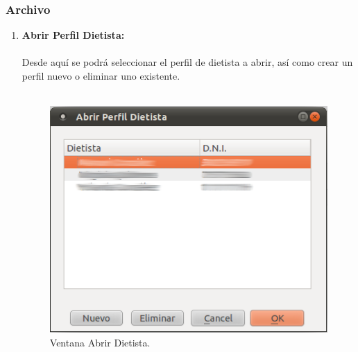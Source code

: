 \subsubsection{Archivo}
\begin{enumerate}
\item \textbf{Abrir Perfil Dietista:}\\\\
Desde aquí se podrá seleccionar el perfil de dietista a abrir, así como crear un perfil nuevo o eliminar uno existente.\\\\
\begin{figure}[H]
  \label{abrir_dietista}
  \begin{center}
    \includegraphics[scale=0.5]{../../Image/dietista-abrir.png} 
  \end{center}
  \caption{Ventana Abrir Dietista.}
\end{figure}


\end{enumerate}

